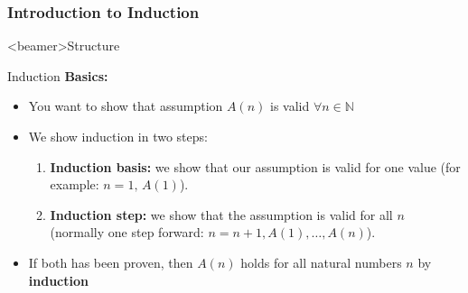 \subsubsection{Introduction to Induction}

\begin{frame}<beamer>{Structure}
\end{frame}

\begin{frame}{Induction}
  \textbf{Basics:}
  \begin{itemize}
    \item<2- | handout:1>
      You want to show that assumption $A(n)$ is valid $\forall n \in \mathbb{N}$
    \item<3- | handout:1>
      We show induction in two steps:
      \begin{enumerate}
        \item<4- | handout:1>
          \textbf{Induction basis:} we show that our assumption is valid 
          for one value (for example: $n = 1, \, A(1)$).
        \item<5- | handout:1>
          \textbf{Induction step:} we show that the assumption is valid for 
          all $n$ (normally one step forward: $n = n + 1, A(1), \ldots, A(n)$).
      \end{enumerate}
    \item<6- | handout:1>
      If both has been proven, then {\color{MainA}$A(n)$} holds for all natural
      numbers {\color{MainA}$n$} by \textbf{induction}
  \end{itemize}
\end{frame}


